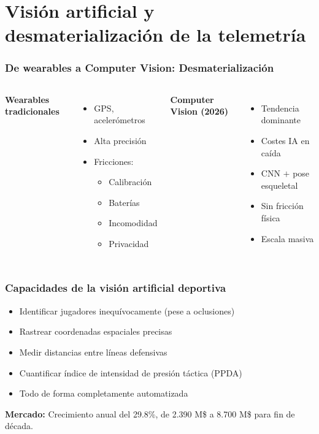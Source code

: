 \documentclass[aspectratio=169]{beamer}
\begin{document}
\section{Visión artificial y desmaterialización de la telemetría}
\frame{\sectionpage}

\begin{frame}\frametitle{De wearables a Computer Vision: Desmaterialización}
\begin{columns}[T]
\textbf{Wearables tradicionales}
\begin{itemize}
    \item GPS, acelerómetros
    \item Alta precisión
    \item Fricciones:
    \begin{itemize}
        \item Calibración
        \item Baterías
        \item Incomodidad
        \item Privacidad
    \end{itemize}
\end{itemize}

\textbf{Computer Vision (2026)}
\begin{itemize}
    \item Tendencia dominante
    \item Costes IA en caída
    \item CNN $+$ pose esqueletal
    \item Sin fricción física
    \item Escala masiva
\end{itemize}
\end{columns}
\end{frame}

\begin{frame}\frametitle{Capacidades de la visión artificial deportiva}
\begin{itemize}
    \item Identificar jugadores inequívocamente (pese a oclusiones)
    \item Rastrear coordenadas espaciales precisas
    \item Medir distancias entre líneas defensivas
    \item Cuantificar índice de intensidad de presión táctica (PPDA)
    \item Todo de forma completamente automatizada
\end{itemize}
\textbf{Mercado:} Crecimiento anual del 29.8\%, de 2.390 M\$ a 8.700 M\$ para fin de década.
\end{frame}
\end{document}
